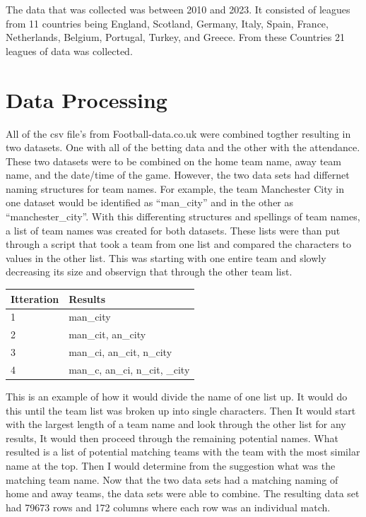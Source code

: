 \documentclass[
  letterpaper,
  DIV=11,
  numbers=noendperiod]{scrartcl}
\begin{document}
The data that was collected was between 2010 and 2023. It consisted of
leagues from 11 countries being England, Scotland, Germany, Italy,
Spain, France, Netherlands, Belgium, Portugal, Turkey, and Greece. From
these Countries 21 leagues of data was collected.

\hypertarget{data-processing}{%
\section{Data Processing}\label{data-processing}}

All of the csv file's from Football-data.co.uk were combined togther
resulting in two datasets. One with all of the betting data and the
other with the attendance. These two datasets were to be combined on the
home team name, away team name, and the date/time of the game. However,
the two data sets had differnet naming structures for team names. For
example, the team Manchester City in one dataset would be identified as
``man\_city'' and in the other as ``manchester\_city''. With this
differenting structures and spellings of team names, a list of team
names was created for both datasets. These lists were than put through a
script that took a team from one list and compared the characters to
values in the other list. This was starting with one entire team and
slowly decreasing its size and observign that through the other team
list.

\begin{longtable}[]{@{}ll@{}}
\toprule()
Itteration & Results \\
\midrule()
\endhead
1 & man\_city \\
2 & man\_cit, an\_city \\
3 & man\_ci, an\_cit, n\_city \\
4 & man\_c, an\_ci, n\_cit, \_city \\
\bottomrule()
\end{longtable}

This is an example of how it would divide the name of one list up. It
would do this until the team list was broken up into single characters.
Then It would start with the largest length of a team name and look
through the other list for any results, It would then proceed through
the remaining potential names. What resulted is a list of potential
matching teams with the team with the most similar name at the top. Then
I would determine from the suggestion what was the matching team name.
Now that the two data sets had a matching naming of home and away teams,
the data sets were able to combine. The resulting data set had 79673
rows and 172 columns where each row was an individual match.
\end{document}
